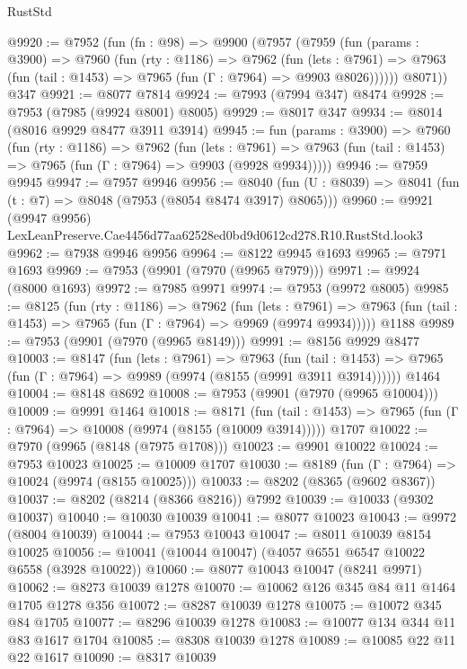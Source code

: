 \begin{lexlean}{RustStd}
\begin{coremodule}
@9920 := @7952
    (fun (fn : @98) =>
    @9900
      (@7957
        (@7959
          (fun (params : @3900) =>
          @7960
            (fun (rty : @1186) =>
            @7962
              (fun (lets : @7961) =>
              @7963 (fun (tail : @1453) => @7965 (fun (Γ : @7964) => @9903 @8026))))))
        @8071))
    @347
@9921 := @8077 @7814
@9924 := @7993 (@7994 @347) @8474
@9928 := @7953 (@7985 (@9924 @8001) @8005)
@9929 := @8017 @347
@9934 := @8014 (@8016 @9929 @8477 @3911 @3914)
@9945 := fun (params : @3900) =>
  @7960
    (fun (rty : @1186) =>
    @7962
      (fun (lets : @7961) =>
      @7963 (fun (tail : @1453) => @7965 (fun (Γ : @7964) => @9903 (@9928 @9934)))))
@9946 := @7959 @9945
@9947 := @7957 @9946
@9956 := @8040 (fun (U : @8039) => @8041 (fun (t : @7) => @8048 (@7953 (@8054 @8474 @3917) @8065)))
@9960 := @9921 (@9947 @9956) LexLeanPreserve.Cae4456d77aa62528ed0bd9d0612cd278.R10.RustStd.look3
@9962 := @7938 @9946 @9956
@9964 := @8122 @9945 @1693
@9965 := @7971 @1693
@9969 := @7953 (@9901 (@7970 (@9965 @7979)))
@9971 := @9924 (@8000 @1693)
@9972 := @7985 @9971
@9974 := @7953 (@9972 @8005)
@9985 := @8125
    (fun (rty : @1186) =>
    @7962
      (fun (lets : @7961) =>
      @7963 (fun (tail : @1453) => @7965 (fun (Γ : @7964) => @9969 (@9974 @9934)))))
    @1188
@9989 := @7953 (@9901 (@7970 (@9965 @8149)))
@9991 := @8156 @9929 @8477
@10003 := @8147
    (fun (lets : @7961) =>
    @7963
      (fun (tail : @1453) => @7965 (fun (Γ : @7964) => @9989 (@9974 (@8155 (@9991 @3911 @3914))))))
    @1464
@10004 := @8148 @8692
@10008 := @7953 (@9901 (@7970 (@9965 @10004)))
@10009 := @9991 @1464
@10018 := @8171
    (fun (tail : @1453) => @7965 (fun (Γ : @7964) => @10008 (@9974 (@8155 (@10009 @3914)))))
    @1707
@10022 := @7970 (@9965 (@8148 (@7975 @1708)))
@10023 := @9901 @10022
@10024 := @7953 @10023
@10025 := @10009 @1707
@10030 := @8189 (fun (Γ : @7964) => @10024 (@9974 (@8155 @10025)))
@10033 := @8202 (@8365 (@9602 @8367))
@10037 := @8202 (@8214 (@8366 @8216)) @7992
@10039 := @10033 (@9302 @10037)
@10040 := @10030 @10039
@10041 := @8077 @10023
@10043 := @9972 (@8004 @10039)
@10044 := @7953 @10043
@10047 := @8011 @10039 @8154 @10025
@10056 := @10041 (@10044 @10047) (@4057 @6551 @6547 @10022 @6558 (@3928 @10022))
@10060 := @8077 @10043 @10047 (@8241 @9971)
@10062 := @8273 @10039 @1278
@10070 := @10062 @126 @345 @84 @11 @1464 @1705 @1278 @356
@10072 := @8287 @10039 @1278
@10075 := @10072 @345 @84 @1705
@10077 := @8296 @10039 @1278
@10083 := @10077 @134 @344 @11 @83 @1617 @1704
@10085 := @8308 @10039 @1278
@10089 := @10085 @22 @11 @22 @1617
@10090 := @8317 @10039

\end{coremodule}
\end{lexlean}
